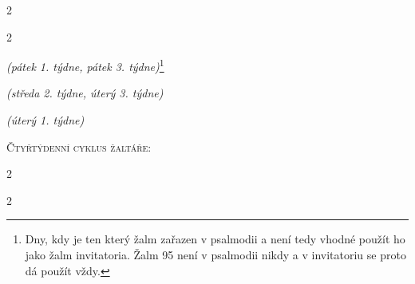 \documentclass[a5paper, twoside]{article}
\newenvironment{hora}{
  \begin{multicols}{2}
}{
  \end{multicols}
}
\begin{document}
\begin{hora}

\columnbreak

\end{hora}


\begin{hora}
\label{zalm95}




{\footnotesize \noindent \textit{(pátek 1. týdne, pátek 3. týdne)}\footnote{
Dny, kdy je ten který žalm zařazen v psalmodii a není tedy vhodné použít ho
jako žalm invitatoria. Žalm 95 není v psalmodii nikdy a v invitatoriu se proto
dá použít vždy.}}



{\footnotesize \noindent \textit{(středa 2. týdne, úterý 3. týdne)}}



{\footnotesize \noindent \textit{(úterý 1. týdne)}}

\end{hora}

\clearpage

\begin{center}
{\LARGE \textsc{Čtyřtýdenní cyklus žaltáře:}}
\end{center}



\nesporyI
\begin{hora}


\label{kantfp2}

\end{hora}

\ranniChvaly
\begin{hora}
\label{zalmyne1trch}



\end{hora}
\end{document}
